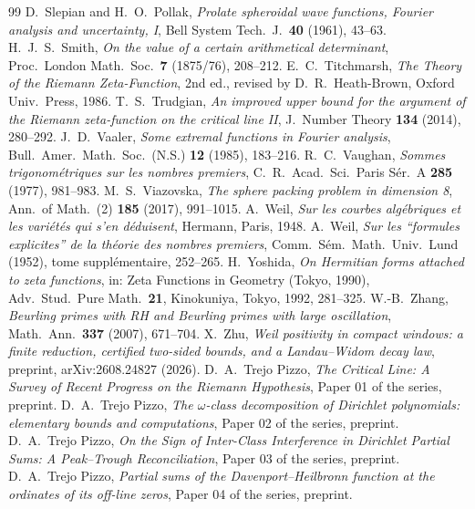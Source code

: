 \documentclass[11pt]{amsart}
\theoremstyle{definition}
\theoremstyle{remark}
\numberwithin{equation}{section}
\begin{document}
\begin{thebibliography}{99}
 D.~Slepian and H.~O.~Pollak, \emph{Prolate spheroidal wave functions, Fourier analysis and uncertainty, I}, Bell System Tech.\ J.\ \textbf{40} (1961), 43--63.
 H.~J.~S.~Smith, \emph{On the value of a certain arithmetical determinant}, Proc.\ London Math.\ Soc.\ \textbf{7} (1875/76), 208--212.
 E.~C.~Titchmarsh, \emph{The Theory of the Riemann Zeta-Function}, 2nd ed., revised by D.~R.~Heath-Brown, Oxford Univ.\ Press, 1986.
 T.~S.~Trudgian, \emph{An improved upper bound for the argument of the Riemann zeta-function on the critical line II}, J.\ Number Theory \textbf{134} (2014), 280--292.
 J.~D.~Vaaler, \emph{Some extremal functions in Fourier analysis}, Bull.\ Amer.\ Math.\ Soc.\ (N.S.) \textbf{12} (1985), 183--216.
 R.~C.~Vaughan, \emph{Sommes trigonom\'etriques sur les nombres premiers}, C.~R.\ Acad.\ Sci.\ Paris S\'er.~A \textbf{285} (1977), 981--983.
 M.~S.~Viazovska, \emph{The sphere packing problem in dimension 8}, Ann.\ of Math.\ (2) \textbf{185} (2017), 991--1015.
 A.~Weil, \emph{Sur les courbes alg\'ebriques et les vari\'et\'es qui s'en d\'eduisent}, Hermann, Paris, 1948.
 A.~Weil, \emph{Sur les ``formules explicites'' de la th\'eorie des nombres premiers}, Comm.\ S\'em.\ Math.\ Univ.\ Lund (1952), tome suppl\'ementaire, 252--265.
 H.~Yoshida, \emph{On Hermitian forms attached to zeta functions}, in: Zeta Functions in Geometry (Tokyo, 1990), Adv.\ Stud.\ Pure Math.\ \textbf{21}, Kinokuniya, Tokyo, 1992, 281--325.
 W.-B.~Zhang, \emph{Beurling primes with RH and Beurling primes with large oscillation}, Math.\ Ann.\ \textbf{337} (2007), 671--704.
 X.~Zhu, \emph{Weil positivity in compact windows: a finite reduction, certified two-sided bounds, and a Landau--Widom decay law}, preprint, arXiv:2608.24827 (2026).
 D.~A.~Trejo Pizzo, \emph{The Critical Line: A Survey of Recent Progress on the Riemann Hypothesis}, Paper 01 of the series, preprint.
 D.~A.~Trejo Pizzo, \emph{The $\omega$-class decomposition of Dirichlet polynomials: elementary bounds and computations}, Paper 02 of the series, preprint.
 D.~A.~Trejo Pizzo, \emph{On the Sign of Inter-Class Interference in Dirichlet Partial Sums: A Peak--Trough Reconciliation}, Paper 03 of the series, preprint.
 D.~A.~Trejo Pizzo, \emph{Partial sums of the Davenport--Heilbronn function at the ordinates of its off-line zeros}, Paper 04 of the series, preprint.

\end{thebibliography}
\end{document}
